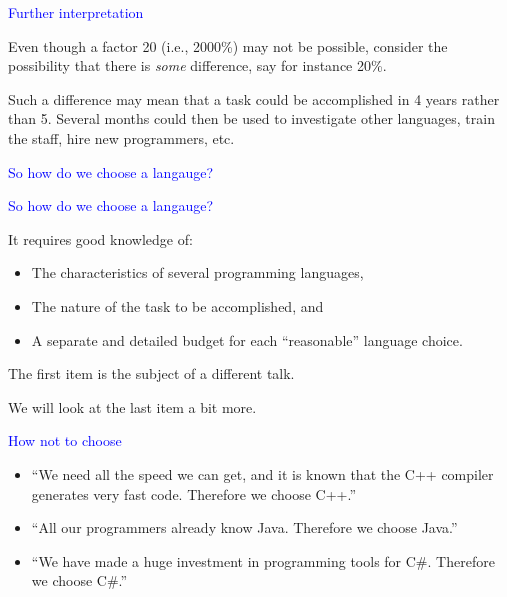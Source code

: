 \documentclass{slides}
\newcommand{\ti}[1]{\begin{center}\Large{\textcolor{blue}{#1}}\end{center}}
\begin{document}
\begin{slide}\ti{Further interpretation}

Even though a factor 20 (i.e., 2000\%) may not be possible, consider
the possibility that there is \emph{some} difference, say for instance
20\%.

Such a difference may mean that a task could be accomplished in 4
years rather than 5.  Several months could then be used to investigate
other languages, train the staff, hire new programmers, etc.

\vfill\end{slide}
\begin{slide}\ti{So how do we choose a langauge?}

\vfill\end{slide}
\begin{slide}\ti{So how do we choose a langauge?}

It requires good knowledge of:

\begin{itemize}
\item The characteristics of several programming languages,
\item The nature of the task to be accomplished, and
\item A separate and detailed budget for each ``reasonable'' language
  choice.
\end{itemize}

The first item is the subject of a different talk.

We will look at the last item a bit more.

\vfill\end{slide}
\begin{slide}\ti{How not to choose}

  \begin{itemize}
  \item ``We need all the speed we can get, and it is known that the
    C++ compiler generates very fast code.  Therefore we choose C++.''
  \item ``All our programmers already know Java.  Therefore we choose
    Java.''
  \item ``We have made a huge investment in programming tools for
    C\#.  Therefore we choose C\#.''
  \end{itemize}

\vfill\end{slide}
\end{document}
